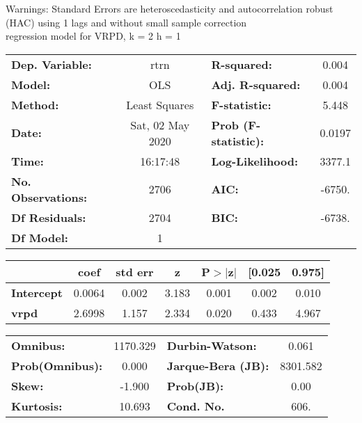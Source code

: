 Warnings: \newline
 [1] Standard Errors are heteroscedasticity and autocorrelation robust (HAC) using 1 lags and without small sample correction\\ 

regression model for VRPD, k = 2 h = 1\begin{center}
\begin{tabular}{lclc}
\toprule
\textbf{Dep. Variable:}    &       rtrn       & \textbf{  R-squared:         } &     0.004   \\
\textbf{Model:}            &       OLS        & \textbf{  Adj. R-squared:    } &     0.004   \\
\textbf{Method:}           &  Least Squares   & \textbf{  F-statistic:       } &     5.448   \\
\textbf{Date:}             & Sat, 02 May 2020 & \textbf{  Prob (F-statistic):} &   0.0197    \\
\textbf{Time:}             &     16:17:48     & \textbf{  Log-Likelihood:    } &    3377.1   \\
\textbf{No. Observations:} &        2706      & \textbf{  AIC:               } &    -6750.   \\
\textbf{Df Residuals:}     &        2704      & \textbf{  BIC:               } &    -6738.   \\
\textbf{Df Model:}         &           1      & \textbf{                     } &             \\
\bottomrule
\end{tabular}
\begin{tabular}{lcccccc}
                   & \textbf{coef} & \textbf{std err} & \textbf{z} & \textbf{P$> |$z$|$} & \textbf{[0.025} & \textbf{0.975]}  \\
\midrule
\textbf{Intercept} &       0.0064  &        0.002     &     3.183  &         0.001        &        0.002    &        0.010     \\
\textbf{vrpd}      &       2.6998  &        1.157     &     2.334  &         0.020        &        0.433    &        4.967     \\
\bottomrule
\end{tabular}
\begin{tabular}{lclc}
\textbf{Omnibus:}       & 1170.329 & \textbf{  Durbin-Watson:     } &    0.061  \\
\textbf{Prob(Omnibus):} &   0.000  & \textbf{  Jarque-Bera (JB):  } & 8301.582  \\
\textbf{Skew:}          &  -1.900  & \textbf{  Prob(JB):          } &     0.00  \\
\textbf{Kurtosis:}      &  10.693  & \textbf{  Cond. No.          } &     606.  \\
\bottomrule
\end{tabular}
\end{center}

